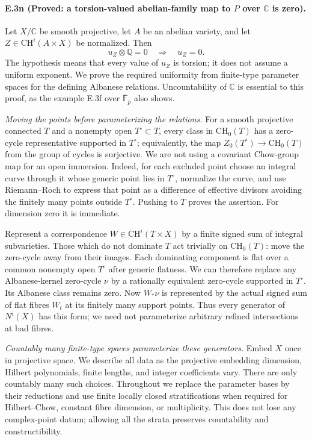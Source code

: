 \paragraph{E.3n (Proved: a torsion-valued abelian-family map to $P$ over
$\mathbb C$ is zero).}
Let $X/\mathbb C$ be smooth projective, let $A$ be an abelian
variety, and let $Z\in\mathrm{CH}^i(A\times X)$ be normalized.
Then
\[
 u_Z\otimes\mathbb Q=0\quad\Longrightarrow\quad u_Z=0.
\]
The hypothesis means that every value of $u_Z$ is torsion;
it does not assume a uniform exponent. We prove the required
uniformity from finite-type parameter spaces for the defining
Albanese relations. Uncountability of $\mathbb C$ is essential
to this proof, as the example E.3f over $\overline{\mathbb F}_p$
also shows.

\emph{Moving the points before parameterizing the relations.}
For a smooth projective connected $T$ and a nonempty open
$T^\circ\subset T$, every class in $\mathrm{CH}_0(T)$ has a
zero-cycle representative supported in $T^\circ$; equivalently,
the map $Z_0(T^\circ)\to\mathrm{CH}_0(T)$ from the group of
cycles is surjective. We are not using a covariant Chow-group
map for an open immersion.
Indeed, for each excluded point choose an integral curve
through it whose generic point lies in $T^\circ$, normalize
the curve, and use Riemann--Roch to express that point as a
difference of effective divisors avoiding the finitely many
points outside $T^\circ$. Pushing to $T$ proves the assertion.
For dimension zero it is immediate.

Represent a correspondence $W\in\mathrm{CH}^i(T\times X)$
by a finite signed sum of integral subvarieties. Those which
do not dominate $T$ act trivially on $\mathrm{CH}_0(T)$:
move the zero-cycle away from their images. Each dominating
component is flat over a common nonempty open $T^\circ$
after generic flatness. We can therefore replace any
Albanese-kernel zero-cycle $\nu$ by a rationally equivalent
zero-cycle supported in $T^\circ$. Its Albanese class remains
zero. Now $W_*\nu$ is represented by the actual signed
sum of flat fibres $W_t$ at its finitely many support points.
Thus every generator of $N^i(X)$ has this form; we need not
parameterize arbitrary refined intersections at bad fibres.

\emph{Countably many finite-type spaces parameterize these generators.}
Embed $X$ once in projective space. We describe all data as
the projective embedding dimension, Hilbert polynomials,
finite lengths, and integer coefficients vary. There are
only countably many such choices.
Throughout we replace the parameter bases by their reductions
and use finite locally closed stratifications when required
for Hilbert--Chow, constant fibre dimension, or multiplicity.
This does not lose any complex-point datum; allowing all the
strata preserves countability and constructibility.

